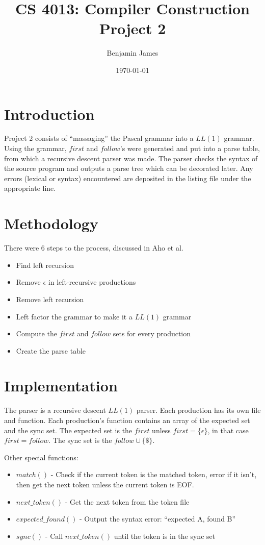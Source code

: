\documentclass[titlepage]{article}
\author{Benjamin James}
\title{\textbf{CS 4013:  Compiler Construction \\ Project 2}}
\date{\today}
\begin{document}
\maketitle

\section*{Introduction}
Project 2 consists of ``massaging'' the Pascal grammar into a $LL(1)$ grammar.
Using the grammar, $first$ and $follow$'s were generated and put into
a parse table, from which a recursive descent parser was made.
The parser checks the syntax of the source program and outputs a parse tree
which can be decorated later. Any errors (lexical or syntax) encountered
are deposited in the listing file under the appropriate line.
\section*{Methodology}

There were 6 steps to the process, discussed in Aho et al.\cite{Aho86}

\begin{itemize}
  \item Find left recursion
  \item Remove $\epsilon$ in left-recursive productions
  \item Remove left recursion
  \item Left factor the grammar to make it a $LL(1)$ grammar
  \item Compute the $first$ and $follow$ sets for every production
  \item Create the parse table
\end{itemize}






\section*{Implementation}
The parser is a recursive descent $LL(1)$ parser.
Each production has its own file and function.
Each production's function contains an array of the
expected set and the sync set.
The expected set is the $first$ unless $first = \{\epsilon\}$, in that case $first = follow$.
The sync set is the $follow \cup \{\$\}$.

Other special functions:
\begin{itemize}
  \item $match()$ - Check if the current token is the matched token, error if it isn't, then get the next token unless the current token is EOF.
  \item $next\_token()$ - Get the next token from the token file
  \item $expected\_found()$ - Output the syntax error: ``expected A, found B''
  \item $sync()$ - Call $next\_token()$ until the token is in the sync set
\end{itemize}
\end{document}
